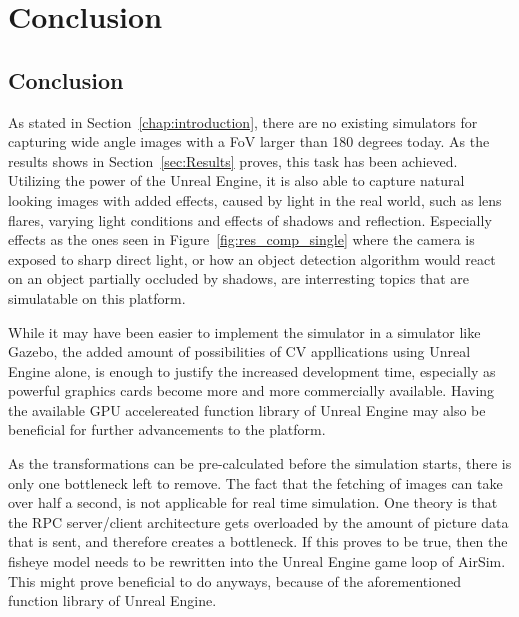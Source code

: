 
\chapter{Conclusion}
\section{Conclusion}
As stated in Section~\ref{chap:introduction}, there are no existing simulators for capturing wide angle images with a FoV larger than 180 degrees today. As the results shows in Section~\ref{sec:Results} proves, this task has been achieved. Utilizing the power of the Unreal Engine, it is also able to capture natural looking images with added effects, caused by light in the real world, such as lens flares, varying light conditions and effects of shadows and reflection. Especially effects as the ones seen in Figure~\ref{fig:res_comp_single} where the camera is exposed to sharp direct light, or how an object detection algorithm would react on an object partially occluded by shadows, are interresting topics that are simulatable on this platform.

While it may have been easier to implement the simulator in a simulator like Gazebo, the added amount of possibilities of CV appllications using Unreal Engine alone, is enough to justify the increased development time, especially as powerful graphics cards become more and more commercially available. Having the available GPU accelereated function library of Unreal Engine may also be beneficial for further advancements to the platform.

As the transformations can be pre-calculated before the simulation starts, there is only one bottleneck left to remove. The fact that the fetching of images can take over half a second, is not applicable for real time simulation. One theory is that the RPC server/client architecture gets overloaded by the amount of picture data that is sent, and therefore creates a bottleneck. If this proves to be true, then the fisheye model needs to be rewritten into the Unreal Engine game loop of AirSim. This might prove beneficial to do anyways, because of the aforementioned function library of Unreal Engine.

